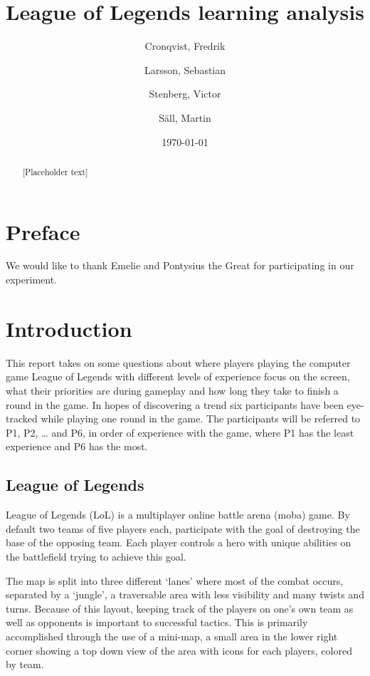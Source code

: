 \documentclass[notitlepage]{report}
\author{Cronqvist, Fredrik \and Larsson, Sebastian \and Stenberg, Victor \and S\"{a}ll, Martin}
\date{\today}
\title{League of Legends learning analysis}
\begin{document}
\maketitle

\begin{abstract}
[Placeholder text]
\end{abstract}

\begingroup
\chapter*{Preface}
We would like to thank Emelie and Pontysius the Great for participating in our experiment.

\let\clearpage\relax

\tableofcontents
\endgroup

\chapter{Introduction}
This report takes on some questions about where players playing the computer game League of Legends with different levels of experience focus on the screen, what their priorities are during gameplay and how long they take to finish a round in the game. In hopes of discovering a trend six participants have been eye-tracked while playing one round in the game. The participants will be referred to P1, P2, … and P6, in order of experience with the game, where P1 has the least experience and P6 has the most.

\section{League of Legends}
League of Legends (LoL) is a multiplayer online battle arena (moba) game. By default two teams of five players each, participate with the goal of destroying the base of the opposing team. Each player controls a hero with unique abilities on the battlefield trying to achieve this goal.

The map is split into three different `lanes' where most of the combat occurs, separated by a `jungle', a traversable area with less visibility and many twists and turns. Because of this layout, keeping track of the players on one's own team as well as opponents is important to successful tactics. This is primarily accomplished through the use of a mini-map, a small area in the lower right corner showing a top down view of the area with icons for each players, colored by team.
\end{document}
